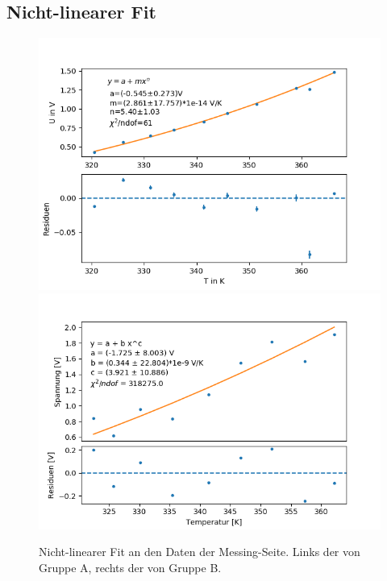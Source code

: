 \documentclass[12pt,a4paper]{article}
\begin{document}
\subsection{Nicht-linearer Fit}
\begin{figure}[H]
\centering
\includegraphics[scale=0.5]{Bilder/nichtlinear_A_messing.png}
\includegraphics[scale=0.5]{Bilder/nonlinear_messing_B.png}
\caption{Nicht-linearer Fit an den Daten der Messing-Seite. Links der von Gruppe A, rechts der von Gruppe B.}
\end{figure}
\end{document}
